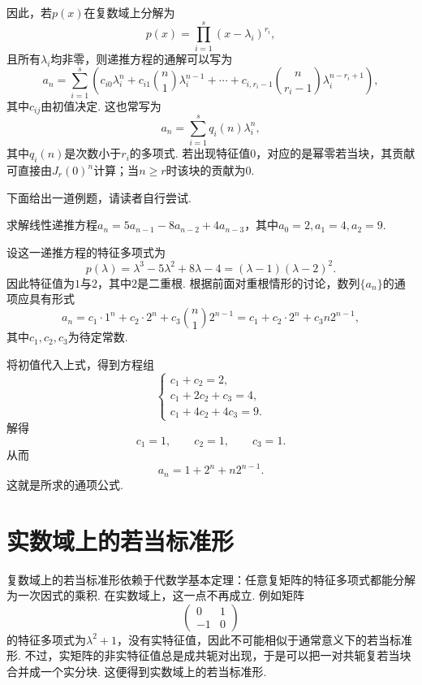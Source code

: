 因此，若$p(x)$在复数域上分解为
\[
    p(x)=\prod_{i=1}^s(x-\lambda_i)^{r_i},
\]
且所有$\lambda_i$均非零，则递推方程的通解可以写为
\[
    a_n=\sum_{i=1}^s\left(c_{i0}\lambda_i^n+c_{i1}\binom{n}{1}\lambda_i^{n-1}+\cdots+c_{i,r_i-1}\binom{n}{r_i-1}\lambda_i^{n-r_i+1}\right),
\]
其中$c_{ij}$由初值决定. 这也常写为
\[
    a_n=\sum_{i=1}^s q_i(n)\lambda_i^n,
\]
其中$q_i(n)$是次数小于$r_i$的多项式. 若出现特征值$0$，对应的是幂零若当块，其贡献可直接由$J_r(0)^n$计算；当$n\geqslant r$时该块的贡献为$0$.

下面给出一道例题，请读者自行尝试.

\begin{example}{}{}
    求解线性递推方程$a_n = 5a_{n - 1} - 8a_{n - 2} + 4a_{n - 3}$，其中$a_0 = 2, a_1 = 4, a_2 = 9$.
\end{example}
\begin{solution}
    设这一递推方程的特征多项式为
    \[
        p(\lambda)=\lambda^3-5\lambda^2+8\lambda-4=(\lambda-1)(\lambda-2)^2.
    \]
    因此特征值为$1$与$2$，其中$2$是二重根. 根据前面对重根情形的讨论，数列$\{a_n\}$的通项应具有形式
    \[
        a_n=c_1\cdot 1^n+c_2\cdot 2^n+c_3\binom{n}{1}2^{n-1}
        =c_1+c_2\cdot 2^n+c_3n2^{n-1},
    \]
    其中$c_1,c_2,c_3$为待定常数.

    将初值代入上式，得到方程组
    \[
        \begin{cases}
            c_1+c_2=2, \\
            c_1+2c_2+c_3=4, \\
            c_1+4c_2+4c_3=9.
        \end{cases}
    \]
    解得
    \[
        c_1=1,\qquad c_2=1,\qquad c_3=1.
    \]
    从而
    \[
        a_n=1+2^n+n2^{n-1}.
    \]
    这就是所求的通项公式.
\end{solution}

\section{实数域上的若当标准形} \label{sec:实数域上的若当标准形}

复数域上的若当标准形依赖于代数学基本定理：任意复矩阵的特征多项式都能分解为一次因式的乘积. 在实数域上，这一点不再成立. 例如矩阵
\[
    \begin{pmatrix}
        0 & 1 \\ -1 & 0
    \end{pmatrix}
\]
的特征多项式为$\lambda^2+1$，没有实特征值，因此不可能相似于通常意义下的若当标准形. 不过，实矩阵的非实特征值总是成共轭对出现，于是可以把一对共轭复若当块合并成一个实分块. 这便得到实数域上的若当标准形.


